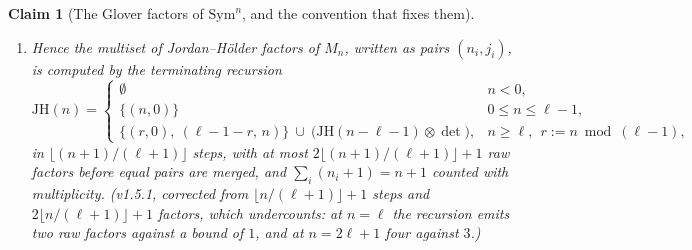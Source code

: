\documentclass[11pt]{article}
\newtheorem{claim}[theorem]{Claim}
\theoremstyle{remark}
\newcommand{\Sym}{\mathrm{Sym}}
\newcommand{\Mn}{M_n}
\newcommand{\PROVED}{\textsf{[proved here]}}
\begin{document}
\begin{claim}[The Glover factors of $\Sym^n$, and the convention that fixes them]
\begin{enumerate}
  $r=(s-t)\bmod(\ell-1)$, the trivial/Steinberg pair when $r=0$ (v1.21.0-pre.5: \PROVED{} below; \cite{glover} states no
  induced-module result --- its (4.1), p.~439, (4.2), p.~440, (5.7), p.~454, (6.4), p.~461, describe $\Sym^{n}$ by explicit bases ---
  so the earlier citation for this item is withdrawn).
\item Hence the multiset of Jordan--H\"older factors of $\Mn$, written as pairs
  $(n_i,j_i)$, is computed by the terminating recursion
  \[
    \mathrm{JH}(n)=\begin{cases}
      \emptyset & n<0,\\[2pt]
      \{(n,0)\} & 0\le n\le\ell-1,\\[2pt]
      \{(r,0),\ (\ell-1-r,\,n)\}\ \cup\ \bigl(\mathrm{JH}(n-\ell-1)\otimes\det\bigr),
        & n\ge\ell,\ \ r:=n\bmod(\ell-1),
    \end{cases}
  \]
  in $\lfloor (n+1)/(\ell+1)\rfloor$ steps, with at most
  $2\lfloor (n+1)/(\ell+1)\rfloor+1$ raw
  factors before equal pairs are merged, and $\sum_i(n_i+1)=n+1$ counted with multiplicity.
  (v1.5.1, corrected from $\lfloor n/(\ell+1)\rfloor+1$ steps and
  $2\lfloor n/(\ell+1)\rfloor+1$ factors, which undercounts: at $n=\ell$ the recursion emits
  two raw factors against a bound of $1$, and at $n=2\ell+1$ four against $3$.)
\end{enumerate}
\end{claim}
\end{document}
